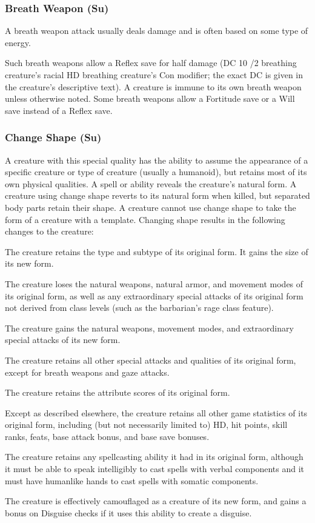 {\subsubsection{Breath Weapon (Su)} A breath weapon attack usually deals damage and is often based on some type of energy.
\par Such breath weapons allow a Reflex save for half damage (DC 10 /2 breathing creature's racial HD \add breathing creature's Con modifier; the exact DC is given in the creature's descriptive text). A creature is immune to its own breath weapon unless otherwise noted. Some breath weapons allow a Fortitude save or a Will save instead of a Reflex save.

\subsubsection{Change Shape (Su)} A creature with this special quality has the ability to assume the appearance of a specific creature or type of creature (usually a humanoid), but retains most of its own physical qualities. A  spell or ability reveals the creature's natural form. A creature using change shape reverts to its natural form when killed, but separated body parts retain their shape. A creature cannot use change shape to take the form of a creature with a template. Changing shape results in the following changes to the creature:
\begin{itemize*}
\item The creature retains the type and subtype of its original form. It gains the size of its new form.
\item The creature loses the natural weapons, natural armor, and movement modes of its original form, as well as any extraordinary special attacks of its original form not derived from class levels (such as the barbarian's rage class feature).
\item The creature gains the natural weapons, movement modes, and extraordinary special attacks of its new form.
\item The creature retains all other special attacks and qualities of its original form, except for breath weapons and gaze attacks.
\item The creature retains the attribute scores of its original form.
\item Except as described elsewhere, the creature retains all other game statistics of its original form, including (but not necessarily limited to) HD, hit points, skill ranks, feats, base attack bonus, and base save bonuses. 
\item The creature retains any spellcasting ability it had in its original form, although it must be able to speak intelligibly to cast spells with verbal components and it must have humanlike hands to cast spells with somatic components.
\item The creature is effectively camouflaged as a creature of its new form, and gains a   bonus on Disguise checks if it uses this ability to create a disguise.
\end{itemize*}

}
